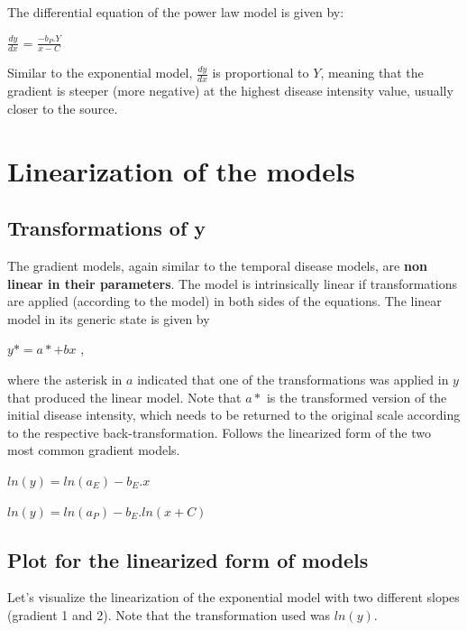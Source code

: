 \documentclass[
  letterpaper,
  DIV=11,
  numbers=noendperiod]{scrreprt}
\begin{document}
The differential equation of the power law model is given by:

\(\frac{dy}{dx}\) = \(\frac{-b_{P}.Y}{x - C}\)

Similar to the exponential model, \(\frac{dy}{dx}\) is proportional to
\(Y\), meaning that the gradient is steeper (more negative) at the
highest disease intensity value, usually closer to the source.

\hypertarget{linearization-of-the-models}{%
\section{Linearization of the
models}\label{linearization-of-the-models}}

\hypertarget{transformations-of-y}{%
\subsection{Transformations of y}\label{transformations-of-y}}

The gradient models, again similar to the temporal disease models, are
\textbf{non linear in their parameters}. The model is intrinsically
linear if transformations are applied (according to the model) in both
sides of the equations. The linear model in its generic state is given
by

\(y* = a* + bx\) ,

where the asterisk in \(a\) indicated that one of the transformations
was applied in \(y\) that produced the linear model. Note that \(a*\) is
the transformed version of the initial disease intensity, which needs to
be returned to the original scale according to the respective
back-transformation. Follows the linearized form of the two most common
gradient models.

\(ln(y) = ln(a_{E}) - b_{E}. x\)

\(ln(y) = ln(a_{P}) - b_{E}. ln(x+C)\)

\hypertarget{plot-for-the-linearized-form-of-models}{%
\subsection{Plot for the linearized form of
models}\label{plot-for-the-linearized-form-of-models}}

Let's visualize the linearization of the exponential model with two
different slopes (gradient 1 and 2). Note that the transformation used
was \(ln(y)\).
\end{document}
